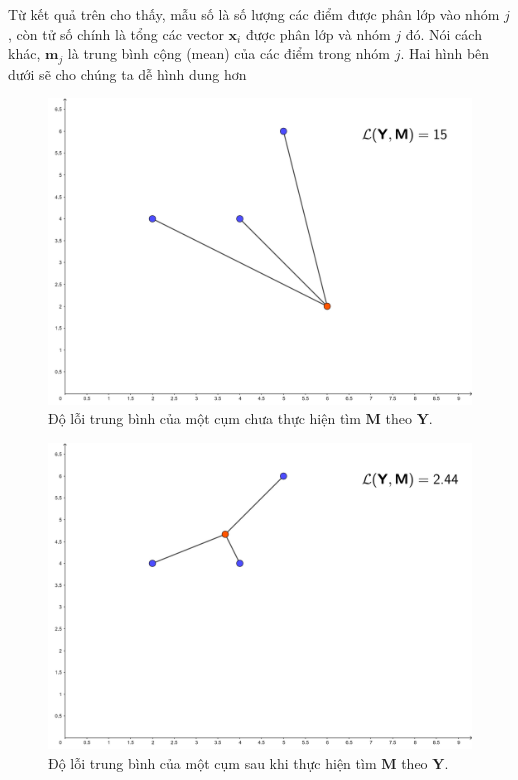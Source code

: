 \documentclass{article}
\begin{document}
\begin{itemize}
		Từ kết quả trên cho thấy, mẫu số là số lượng các điểm được phân lớp vào nhóm $j$, còn tử số chính là tổng các vector $\mathbf{x}_i$ được phân lớp và nhóm $j$ đó. Nói cách khác,
		$\mathbf{m}_j$ là trung bình cộng (mean) của các điểm trong nhóm $j$. Hai hình bên dưới sẽ cho chúng ta dễ hình dung hơn
		\begin{figure}[h]
		\centering
		\includegraphics[width = 0.5\linewidth]{img/findM1}
		\caption{Độ lỗi trung bình của một cụm chưa thực hiện tìm $\mathbf{M}$ theo $\mathbf{Y}$.}
		\label{fig:figure1}
		\end{figure}
		\end{itemize}
		\begin{figure}[h]
		\centering
		\includegraphics[width = 0.5\linewidth]{img/findM2}
		\caption{Độ lỗi trung bình của một cụm sau khi thực hiện tìm $\mathbf{M}$ theo $\mathbf{Y}$.}
		\label{fig:figure1}
		\end{figure}
\end{document}
